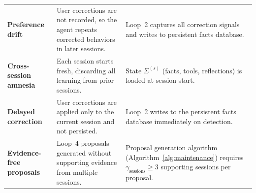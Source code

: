 \begin{table}[H]
\begin{tabularx}{\textwidth}{lXX}
\textbf{Preference drift} &
User corrections are not recorded, so the agent repeats corrected behaviors
in later sessions. &
Loop~2 captures all correction signals and writes to persistent facts database. \\[6pt]

\textbf{Cross-session amnesia} &
Each session starts fresh, discarding all learning from prior sessions. &
State $\Sigma^{(s)}$ (facts, tools, reflections) is loaded at session start. \\[6pt]

\textbf{Delayed correction} &
User corrections are applied only to the current session and not persisted. &
Loop~2 writes to the persistent facts database immediately on detection. \\[6pt]

\textbf{Evidence-free proposals} &
Loop~4 proposals generated without supporting evidence from multiple sessions. &
Proposal generation algorithm (Algorithm~\ref{alg:maintenance}) requires
$\gamma_{\text{sessions}} \geq 3$ supporting sessions per proposal. \\
\bottomrule
\end{tabularx}
\end{table}

